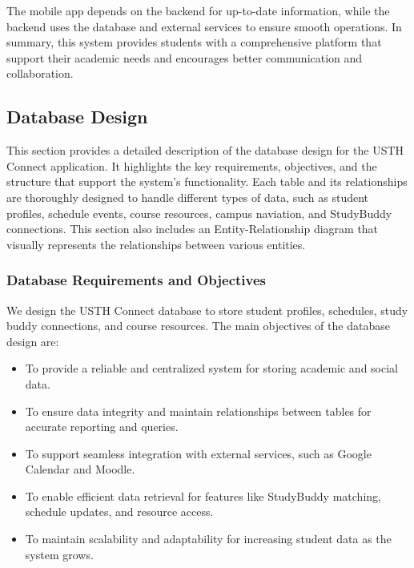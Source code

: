 \documentclass[12pt]{article}
\begin{document}
The mobile app depends on the backend for up-to-date information, while the backend uses the database and external services to ensure smooth operations.
In summary, this system provides students with a comprehensive platform that support their academic needs and encourages better communication and collaboration.

\pagebreak
\subsection{Database Design}
This section provides a detailed description of the database design for the USTH Connect application.
It highlights the key requirements, objectives, and the structure that support the system's functionality.
Each table and its relationships are thoroughly designed to handle different types of data, such as student profiles, schedule events, course resources, campus naviation, and StudyBuddy connections.
This section also includes an Entity-Relationship diagram that visually represents the relationships between various entities.

\subsubsection{Database Requirements and Objectives}  
We design the USTH Connect database to store student profiles, schedules, study buddy connections, and course resources. The main objectives of the database design are:  
\begin{itemize}  
    \item To provide a reliable and centralized system for storing academic and social data.  
    \item To ensure data integrity and maintain relationships between tables for accurate reporting and queries.  
    \item To support seamless integration with external services, such as Google Calendar and Moodle.  
    \item To enable efficient data retrieval for features like StudyBuddy matching, schedule updates, and resource access.  
    \item To maintain scalability and adaptability for increasing student data as the system grows.  
\end{itemize} 
\end{document}

